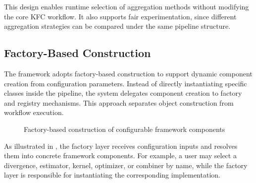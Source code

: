 This design enables runtime selection of aggregation methods without modifying the core KFC workflow. It also supports fair experimentation, since different aggregation strategies can be compared under the same pipeline structure.


\subsection{Factory-Based Construction}

\hs The framework adopts factory-based construction to support dynamic component creation from configuration parameters. Instead of directly instantiating specific classes inside the pipeline, the system delegates component creation to factory and registry mechanisms. This approach separates object construction from workflow execution.

\begin{figure}[H]
      \centering
      \caption{Factory-based construction of configurable framework components}
      \label{fig:factory-based-construction}
\end{figure}

As illustrated in , the factory layer receives configuration inputs and resolves them into concrete framework components. For example, a user may select a divergence, estimator, kernel, optimizer, or combiner by name, while the factory layer is responsible for instantiating the corresponding implementation.

